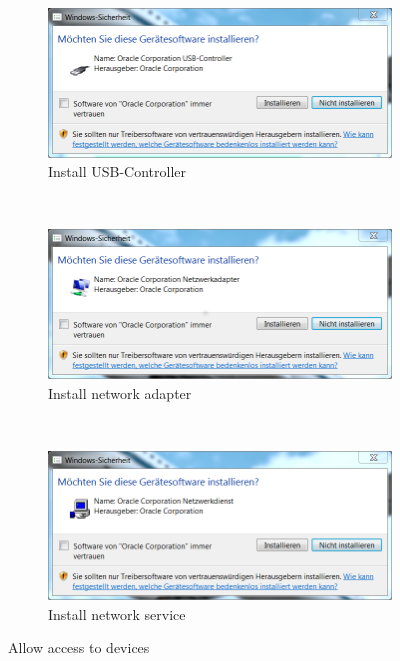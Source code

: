 \begin{figure}[htbp]
  \begin{subfigure}{\linewidth}
    \centering
    \includegraphics[scale=\screenshotscalefac]{Figures/VirtualBox_Install_Allow_USB}
    \caption{Install USB-Controller}
    \label{fig:VirtualBox_Install_Allow_USB}
  \end{subfigure}%
\vspace{1ex}\\
% 
  \begin{subfigure}{\linewidth}
    \centering
    \includegraphics[scale=\screenshotscalefac]{Figures/VirtualBox_Install_Allow_Network_Adapter}
    \caption{Install network adapter}
    \label{fig:VirtualBox_Install_Allow_Network}
  \end{subfigure}%
  \vspace{1ex}\\
  \begin{subfigure}{\linewidth}
    \centering
    \includegraphics[scale=\screenshotscalefac]{Figures/VirtualBox_Install_Allow_Network_Service}
    \caption{Install network service}
   \label{fig:VirtualBox_Install_Allow_Network_Service}
  \end{subfigure}%
  \caption{Allow \marktool{\virtualboxname} access to devices}
  \label{fig:VirtualBox_Install_Allow}
\end{figure}

